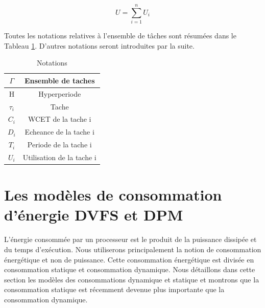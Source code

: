 \begin{equation}
U = \sum_{i=1}^{n} U_i
\end{equation}

Toutes les notations relatives à l’ensemble de tâches sont résumées dans le Tableau \ref{tab:recap}. D’autres notations seront introduites par la suite.
\begin{table}[h]
\begin{center}
\begin{tabular}{|c|c|}
 \hline $\Gamma$ & Ensemble de taches \\ 
 \hline H & Hyperperiode \\ 
 \hline $\tau_i$ & Tache \\ 
 \hline $C_i$ & WCET de la tache i \\ 
 \hline $D_i$ & Echeance de la tache i \\ 
 \hline $T_i$ & Periode de la tache i \\ 
 \hline $U_i$ & Utilisation de la tache i \\ 
 \hline 
 \end{tabular}
\end{center}
\caption{Notations} \label{tab:recap}
\end{table}
\vspace{1cm}

\section{Les modèles de consommation d'énergie DVFS et DPM}
\vspace{-1cm}
L’énergie consommée par un processeur est le produit de la puissance dissipée et du temps d’exécution. Nous utiliserons principalement la notion de consommation énergétique et non de puissance. Cette consommation énergétique est divisée en consommation statique et consommation dynamique. Nous détaillons dans cette section les modèles des consommations dynamique et statique et montrons que la consommation statique est récemment devenue plus importante que la consommation dynamique.
